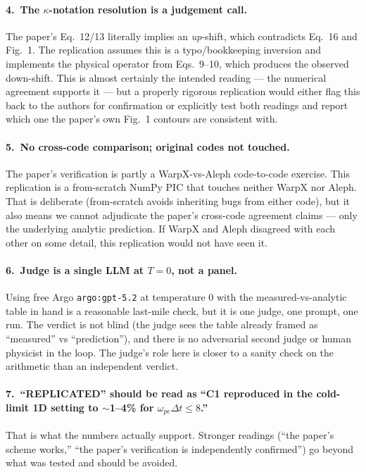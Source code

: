 \documentclass[11pt]{article}
\begin{document}
\paragraph{4.\ The $\kappa$-notation resolution is a judgement call.}
The paper's Eq.~12/13 literally implies an \emph{up}-shift, which
contradicts Eq.~16 and Fig.~1. The replication assumes this is a
typo/bookkeeping inversion and implements the physical operator from
Eqs.~9--10, which produces the observed down-shift. This is almost
certainly the intended reading --- the numerical agreement supports it
--- but a properly rigorous replication would either flag this back to
the authors for confirmation or explicitly test both readings and
report which one the paper's own Fig.~1 contours are consistent with.

\paragraph{5.\ No cross-code comparison; original codes not touched.}
The paper's verification is partly a WarpX-vs-Aleph code-to-code
exercise. This replication is a from-scratch NumPy PIC that touches
neither WarpX nor Aleph. That is deliberate (from-scratch avoids
inheriting bugs from either code), but it also means we cannot
adjudicate the paper's cross-code agreement claims --- only the
underlying analytic prediction. If WarpX and Aleph disagreed with each
other on some detail, this replication would not have seen it.

\paragraph{6.\ Judge is a single LLM at $T=0$, not a panel.}
Using free Argo \texttt{argo:gpt-5.2} at temperature 0 with the
measured-vs-analytic table in hand is a reasonable last-mile check, but
it is one judge, one prompt, one run. The verdict is not blind (the
judge sees the table already framed as ``measured'' vs ``prediction''),
and there is no adversarial second judge or human physicist in the
loop. The judge's role here is closer to a sanity check on the
arithmetic than an independent verdict.

\paragraph{7.\ ``REPLICATED'' should be read as ``C1 reproduced in the
cold-limit 1D setting to $\sim$1--4\% for $\omega_{pe}\Delta t\le 8$.''}
That is what the numbers actually support. Stronger readings
(``the paper's scheme works,'' ``the paper's verification is
independently confirmed'') go beyond what was tested and should be
avoided.
\end{document}
